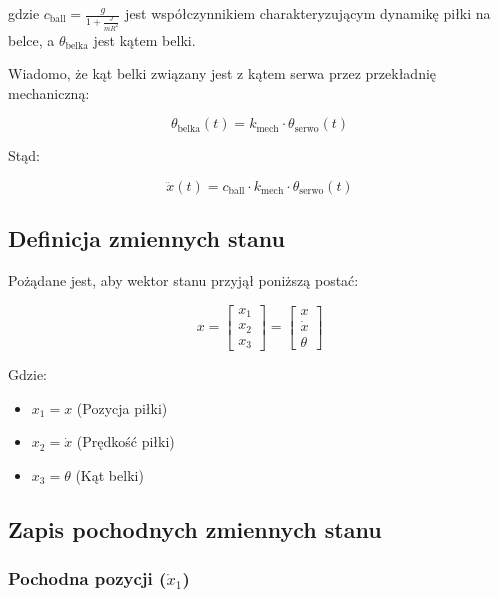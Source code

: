 gdzie $c_{\mathrm{ball}} = \frac{g}{1 + \frac{J}{m R^2}}$ jest współczynnikiem charakteryzującym dynamikę piłki na belce, a $\theta_{\mathrm{belka}}$ jest kątem belki.

Wiadomo, że kąt belki związany jest z kątem serwa przez przekładnię mechaniczną:

\begin{equation}
\theta_{\mathrm{belka}}(t) = k_{\mathrm{mech}} \cdot \theta_{\mathrm{serwo}}(t)
\end{equation}

Stąd:

\begin{equation}
\ddot{x}(t) = c_{\mathrm{ball}} \cdot k_{\mathrm{mech}} \cdot \theta_{\mathrm{serwo}}(t) 
\label{eq:ball_dynamics_with_mech}
\end{equation}

\subsection{Definicja zmiennych stanu}

Pożądane jest, aby wektor stanu przyjął poniższą postać:

\begin{equation}
x = \begin{bmatrix} x_1 \\ x_2 \\ x_3 \end{bmatrix} = \begin{bmatrix} x \\ \dot{x} \\ \theta \end{bmatrix}
\end{equation}

Gdzie:

\begin{itemize}
\item $x_1 = x$ (Pozycja piłki)
\item $x_2 = \dot{x}$ (Prędkość piłki)
\item $x_3 = \theta$ (Kąt belki)
\end{itemize}

\subsection{Zapis pochodnych zmiennych stanu}

\subsubsection{Pochodna pozycji ($\dot{x}_1$)}

